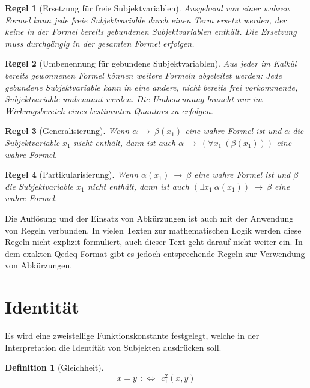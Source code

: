 \documentclass[a4paper,german,10pt,twoside]{book}
\newtheorem{defn}{Definition}
\newtheorem{rul}{Regel}
\newcommand{\defp}{\ :\Leftrightarrow \ }
\newcommand{\impl}{\ \rightarrow \ }
\begin{document}
{\begin{rul}[Ersetzung f{\"u}r freie Subjektvariablen]
Ausgehend von einer wahren Formel kann jede freie Subjektvariable durch einen Term ersetzt werden,
der keine in der Formel bereits gebundenen Subjektvariablen enth{\"a}lt. Die Ersetzung muss durchg{\"a}ngig
in der gesamten Formel erfolgen.
\end{rul}

\begin{rul}[Umbenennung f{\"u}r gebundene Subjektvariablen]
Aus jeder im Kalk{\"u}l bereits gewonnenen Formel k{\"o}nnen weitere Formeln abgeleitet werden: Jede
gebundene Subjektvariable kann in eine andere, nicht bereits frei vorkommende, Subjektvariable
umbenannt werden. Die Umbenennung braucht nur im Wirkungsbereich eines bestimmten Quantors zu
erfolgen.
\end{rul}

\begin{rul}[Generalisierung]
Wenn $\alpha \impl \beta(x_1)$ eine wahre Formel ist und $\alpha$ die Subjektvariable $x_1$ nicht
enth{\"a}lt, dann ist auch $\alpha \impl (\forall x_1~(\beta(x_1)))$ eine wahre Formel.
\end{rul}

\begin{rul}[Partikularisierung]
Wenn $\alpha(x_1) \impl \beta$ eine wahre Formel ist und $\beta$ die Subjektvariable $x_1$ nicht
enth{\"a}lt, dann ist auch $(\exists x_1~\alpha(x_1)) \impl \beta$ eine wahre Formel.
\end{rul}

\par
Die Aufl{\"o}sung und der Einsatz von Abk{\"u}rzungen ist auch mit der Anwendung von Regeln verbunden. In
vielen Texten zur mathematischen Logik werden diese Regeln nicht explizit formuliert, auch dieser
Text geht darauf nicht weiter ein. In dem exakten Qedeq-Format gibt es jedoch entsprechende Regeln
zur Verwendung von Abk{\"u}rzungen.

\section{Identit{\"a}t}\label{gleichheit}
Es wird eine zweistellige Funktionskonstante festgelegt, welche in der Interpretation die Identit{\"a}t
von Subjekten ausdr{\"u}cken soll.
\begin{defn}[Gleichheit]
$$x = y \ \defp \ c_1^2(x, y)$$
\end{defn}

}
\end{document}
